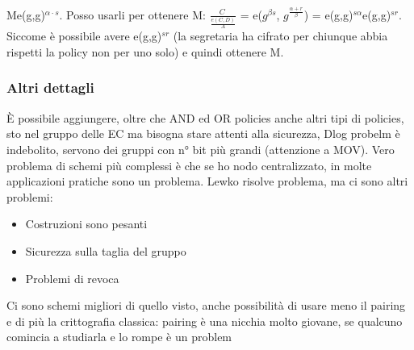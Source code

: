 \documentclass[16px]{article}
\begin{document}
Me(g,g)$^{\alpha\cdot s}$. Posso usarli per ottenere M: $\frac{C^{~}}{\frac{e(C,D)}{A}}$ = e($g^{\beta s}$, $g^{\frac{\alpha+r}{\beta}}$) = e(g,g)$^{s\alpha}$e(g,g)$^{sr}$. Siccome è possibile avere e(g,g)$^{sr}$ (la segretaria ha cifrato per chiunque abbia rispetti la policy non per uno solo) e quindi ottenere M.
\subsubsection{Altri dettagli}
È possibile aggiungere, oltre che AND ed OR policies anche altri tipi di policies, sto nel gruppo delle EC ma bisogna stare attenti alla sicurezza, Dlog probelm è indebolito, servono dei gruppi con n° bit più grandi (attenzione a MOV). Vero problema di schemi più complessi è che se ho nodo centralizzato, in molte applicazioni pratiche sono un problema. Lewko risolve problema, ma ci sono altri problemi: 
\begin{itemize}
\item Costruzioni sono pesanti
\item Sicurezza sulla taglia del gruppo
\item Problemi di revoca 
\end{itemize}
Ci sono schemi migliori di quello visto, anche possibilità di usare meno il pairing e di più la crittografia classica: pairing è una nicchia molto giovane, se qualcuno comincia a studiarla e lo rompe è un problem
\end{document}
